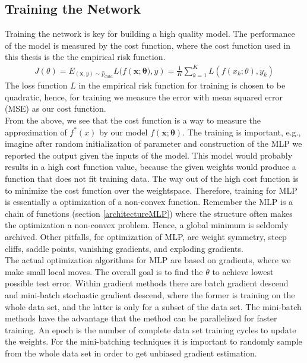 \subsection{Training the Network}\label{trainNetwork}
Training the network is key for building a high quality model. The performance of the model is measured by the cost function, where the cost function used in this thesis is the the empirical risk function.
\begin{align*}
J(\theta)=E_{(\bm{x},y)\sim \hat{p}_{data}} L(f(\bm{x};\bm{\theta)},y)= \frac{1}{K}\sum_{k=1}^{K} L(f(x_k;\theta),y_k)
\end{align*}
The loss function $L$ in the empirical risk function for training is chosen to be quadratic, hence, for training we measure the error with mean squared error (MSE) as our cost function.\\

From the above, we see that the cost function is a way to measure the approximation of $f^*(x)$ by our model $f(\bm{x};\bm{\theta})$. The training is important, e.g., imagine after random initialization of parameter and construction of the MLP we reported the output given the inputs of the model. This model would probably results in a high cost function value, because the given weights would produce a function that does not fit training data. The way out of the high cost function is to minimize the cost function over the weightspace. Therefore, training for MLP is essentially a optimization of a non-convex function. Remember the MLP is a chain of functions (section \ref{architectureMLP}) where the structure often makes the optimization a non-convex problem. Hence, a global minimum is seldomly archived. Other pitfalls, for optimization of MLP, are weight symmetry, steep cliffs, saddle points, vanishing gradients, and exploding gradients.\\

The actual optimization algorithms for MLP are based on gradients, where we make small local moves. The overall goal is to find the $\theta$ to achieve lowest possible test error. Within gradient methods there are batch gradient descend and mini-batch stochastic gradient descend, where the former is training on the whole data set, and the latter is only for a subset of the data set. The mini-batch methods have the advantage that the method can be parallelized for faster training. An epoch is the number of complete data set training cycles to update the weights. For the mini-batching techniques it is important to randomly sample from the whole data set in order to get unbiased gradient estimation. \\

